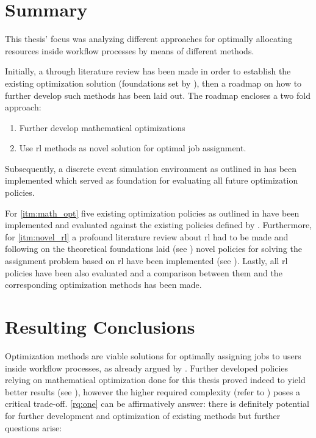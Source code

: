 \documentclass[draft=false]{seal_thesis}
\begin{document}
\section{Summary}

This thesis' focus was analyzing different approaches for optimally allocating resources inside workflow processes by means of different methods.

Initially, a through literature review has been made in order to establish the existing optimization solution (\ie foundations set by \citet{Zeng2005}), then a roadmap on how to further develop such methods has been laid out. The roadmap encloses a two fold approach:

\begin{enumerate}[label=\textbf{Appr. \arabic*},ref=Approach \arabic*]
 	\item Further develop mathematical optimizations \label{itm:math_opt}
 	\item Use \gls{rl} methods as novel solution for optimal job assignment. \label{itm:novel_rl}
 \end{enumerate} 

Subsequently, a discrete event simulation environment as outlined in  has been implemented which served as foundation for evaluating all future optimization policies.

For \ref{itm:math_opt} five existing optimization policies as outlined in  have been implemented and evaluated against the existing policies defined by \citet[pp. 13-14]{Zeng2005}. Furthermore, for \ref{itm:novel_rl} a profound literature review about \gls{rl} had to be made and following on the theoretical foundations laid (see ) novel policies for solving the assignment problem based on \gls{rl} have been implemented (see ). Lastly, all \gls{rl} policies have been also evaluated and a comparison between them and the corresponding optimization methods has been made.

\section{Resulting Conclusions}

Optimization methods are viable solutions for optimally assigning jobs to users inside workflow processes, as already argued by \citet{Zeng2005}. Further developed policies relying on mathematical optimization done for this thesis proved indeed to yield better results (see ), however the higher required complexity (refer to ) poses a critical trade-off. \ref{rq:one} can be affirmatively answer: there is definitely potential for further development and optimization of existing methods but further questions arise:
\end{document}
